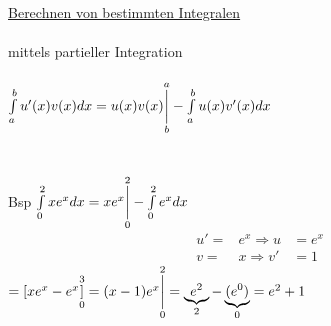 \documentclass[fleqn,a4paper]{scrartcl}
\begin{document}
\underline{Berechnen von bestimmten Integralen} \\\\
mittels partieller Integration \\\\
$\int\limits_a^b u'(x) v(x) dx = u(x) v (x)\underset{b}{\overset{a}{ \bigg{ \vert}}} - \int\limits_a^b u (x) v'(x) dx $ \\\\\\ Bsp $
\int\limits_0^2 x e^x dx = x e^x \underset{0}{\overset{2}{ \bigg{ \vert}}} - \int\limits_0^2 e^x dx $ \\ 
\begin{eqnarray*}
u' =& e^x \Rightarrow u &= e^x \\
v =& x \Rightarrow v' &= 1 
\end{eqnarray*}
$
=[xe^x-e^x\underset{0}{\overset{3}{]}} = (x-1)e^x \underset{0}{\overset{2}{ \bigg{ \vert}}} = \underbrace{e^2}_{2} - \underbrace{(e^0)}_{0} = e^2 +1
$
\end{document}
